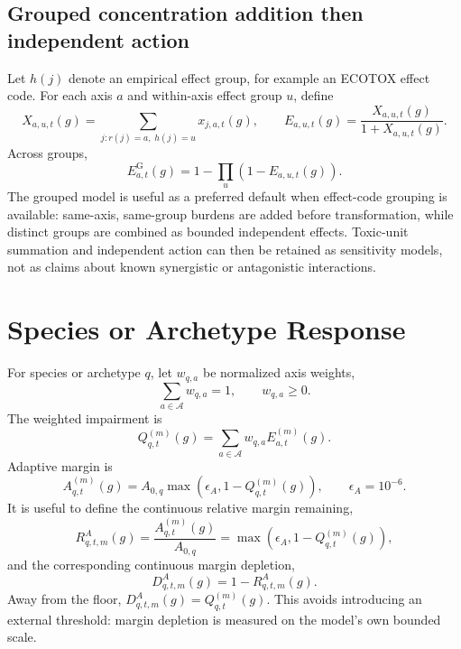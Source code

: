 \documentclass[11pt]{article}
\begin{document}
\subsection{Grouped concentration addition then independent action}
Let $h(j)$ denote an empirical effect group, for example an ECOTOX effect code. For each axis $a$ and
within-axis effect group $u$, define
\begin{equation}
X_{a,u,t}(g)=\sum_{j:r(j)=a,\;h(j)=u}x_{j,a,t}(g),
\qquad
E_{a,u,t}(g)=\frac{X_{a,u,t}(g)}{1+X_{a,u,t}(g)}.
\end{equation}
Across groups,
\begin{equation}
E_{a,t}^{\mathrm{G}}(g)=1-\prod_u\left(1-E_{a,u,t}(g)\right).
\end{equation}
The grouped model is useful as a preferred default when effect-code grouping is available: same-axis,
same-group burdens are added before transformation, while distinct groups are combined as bounded
independent effects. Toxic-unit summation and independent action can then be retained as sensitivity models,
not as claims about known synergistic or antagonistic interactions.

\section{Species or Archetype Response}
For species or archetype $q$, let $w_{q,a}$ be normalized axis weights,
\begin{equation}
\sum_{a\in\mathcal{A}}w_{q,a}=1,\qquad w_{q,a}\ge0.
\end{equation}
The weighted impairment is
\begin{equation}
Q_{q,t}^{(m)}(g)=\sum_{a\in\mathcal{A}}w_{q,a}E_{a,t}^{(m)}(g).
\end{equation}
Adaptive margin is
\begin{equation}
A_{q,t}^{(m)}(g)=A_{0,q}\max\left(\epsilon_A,1-Q_{q,t}^{(m)}(g)\right),
\qquad \epsilon_A=10^{-6}.
\end{equation}
It is useful to define the continuous relative margin remaining,
\begin{equation}
R^A_{q,t,m}(g)=\frac{A_{q,t}^{(m)}(g)}{A_{0,q}}
=\max\left(\epsilon_A,1-Q_{q,t}^{(m)}(g)\right),
\end{equation}
and the corresponding continuous margin depletion,
\begin{equation}
D^A_{q,t,m}(g)=1-R^A_{q,t,m}(g).
\end{equation}
Away from the floor, $D^A_{q,t,m}(g)=Q_{q,t}^{(m)}(g)$. This avoids introducing an external threshold:
margin depletion is measured on the model's own bounded scale.
\end{document}
